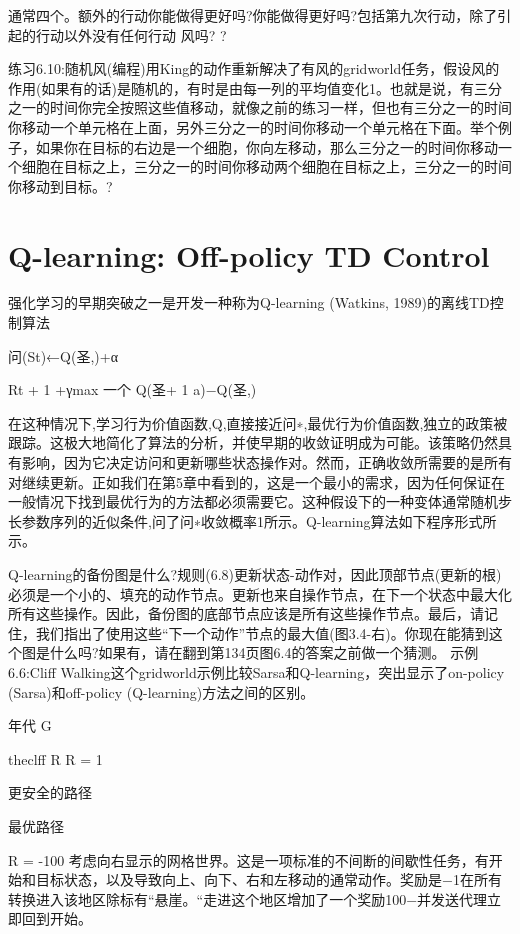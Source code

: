 通常四个。额外的行动你能做得更好吗?你能做得更好吗?包括第九次行动，除了引起的行动以外没有任何行动
风吗? 					?

练习6.10:随机风(编程)用King的动作重新解决了有风的gridworld任务，假设风的作用(如果有的话)是随机的，有时是由每一列的平均值变化1。也就是说，有三分之一的时间你完全按照这些值移动，就像之前的练习一样，但也有三分之一的时间你移动一个单元格在上面，另外三分之一的时间你移动一个单元格在下面。举个例子，如果你在目标的右边是一个细胞，你向左移动，那么三分之一的时间你移动一个细胞在目标之上，三分之一的时间你移动两个细胞在目标之上，三分之一的时间你移动到目标。?


\section{Q-learning: Off-policy TD Control}

强化学习的早期突破之一是开发一种称为Q-learning (Watkins, 1989)的离线TD控制算法

问(St)←Q(圣,)+α

Rt + 1 +γmax
一个
Q(圣+ 1 a)−Q(圣,)

在这种情况下,学习行为价值函数,Q,直接接近问∗,最优行为价值函数,独立的政策被跟踪。这极大地简化了算法的分析，并使早期的收敛证明成为可能。该策略仍然具有影响，因为它决定访问和更新哪些状态操作对。然而，正确收敛所需要的是所有对继续更新。正如我们在第5章中看到的，这是一个最小的需求，因为任何保证在一般情况下找到最优行为的方法都必须需要它。这种假设下的一种变体通常随机步长参数序列的近似条件,问了问∗收敛概率1所示。Q-learning算法如下程序形式所示。

Q-learning的备份图是什么?规则(6.8)更新状态-动作对，因此顶部节点(更新的根)必须是一个小的、填充的动作节点。更新也来自操作节点，在下一个状态中最大化所有这些操作。因此，备份图的底部节点应该是所有这些操作节点。最后，请记住，我们指出了使用这些“下一个动作”节点的最大值(图3.4-右)。你现在能猜到这个图是什么吗?如果有，请在翻到第134页图6.4的答案之前做一个猜测。
示例6.6:Cliff Walking这个gridworld示例比较Sarsa和Q-learning，突出显示了on-policy (Sarsa)和off-policy (Q-learning)方法之间的区别。

年代 					G

theclff
R
R = 1

更安全的路径

最优路径

R = -100
考虑向右显示的网格世界。这是一项标准的不间断的间歇性任务，有开始和目标状态，以及导致向上、向下、右和左移动的通常动作。奖励是−1在所有转换进入该地区除标有“悬崖。“走进这个地区增加了一个奖励100−并发送代理立即回到开始。

